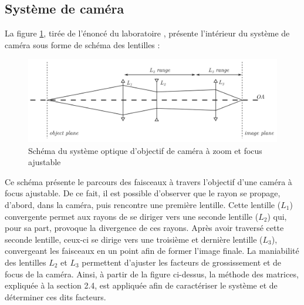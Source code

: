 \documentclass[11pt,letterpaper]{article}
\begin{document}
\subsection{Système de caméra}

La figure \ref{schema_syst}, tirée de l'énoncé du laboratoire \cite{sheehy_experience_2024}, présente
l'intérieur du système de caméra sous forme de schéma des lentilles :

\begin{figure}[H]
  \centering
  \includegraphics[scale=0.2]{systeme_optique.png}
  \caption{Schéma du système optique d'objectif de caméra à zoom et focus ajustable}
  \label{schema_syst}
\end{figure}

Ce schéma présente le parcours des faisceaux à travers l'objectif d'une caméra à focus ajustable. De ce fait, il est possible d'observer que le rayon se propage, d'abord, dans la caméra, puis rencontre une première lentille. Cette lentille ($L_1$) convergente permet aux rayons de se diriger vers une seconde lentille ($L_2$) qui, pour sa part, provoque la divergence de ces rayons. Après avoir traversé cette seconde lentille, ceux-ci se dirige vers une troisième et dernière lentille ($L_3$), convergeant les faisceaux en un point afin de former l'image finale. La maniabilité des lentilles $L_2$ et $L_3$ permettent d'ajuster les facteurs de grossissement et de focus de la caméra. Ainsi, à partir de la figure ci-dessus, la méthode des matrices, expliquée à la section 2.4, est appliquée afin de caractériser le système et de déterminer ces dits facteurs.
\end{document}
